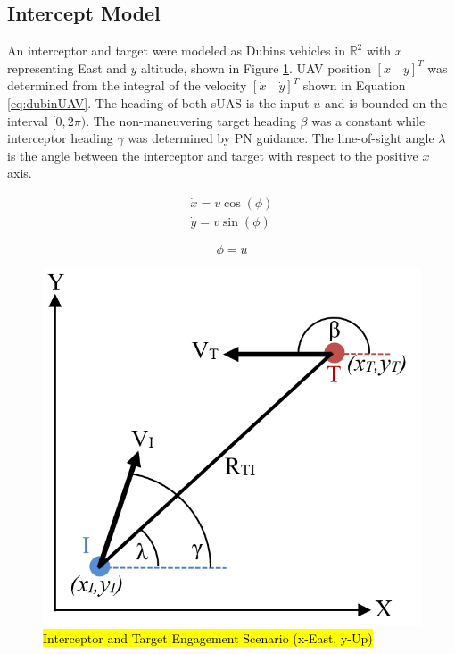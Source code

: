 \documentclass[conference]{IEEEtran}
\begin{document}



\subsection{Intercept Model}

An interceptor and target were modeled as Dubins vehicles in $\mathbb{R}^2$ with $x$ representing East and $y$ altitude, shown in Figure \ref{fig:Egagement}. UAV position $[x \quad y]^T$ was determined from the integral of the velocity $[\dot{x} \quad \dot{y}]^T$ shown in Equation \ref{eq:dubinUAV}. The heading of both sUAS is the input $u$ and is bounded on the interval $[0,2\pi)$. The non-maneuvering target heading $\beta$ was a constant while interceptor heading $\gamma$ was determined by PN guidance. The line-of-sight angle $\lambda$ is the angle between the interceptor and target with respect to the positive $x$ axis. 



\begin{equation} \label{eq:dubinUAV}
\begin{split}
\dot{x} = v\cos(\phi)\\
\dot{y} = v\sin(\phi)
\end{split}
\end{equation}

\begin{equation}\label{eq:dubinsVel}
\phi = u
\end{equation}
 

\begin{figure}[H]
	\centering
	\includegraphics[width=6 cm]{Engagement_Model.PNG}
	\caption{\hl{Interceptor and Target Engagement Scenario (x-East, y-Up)}}
	\label{fig:Egagement}
\end{figure}
\end{document}
